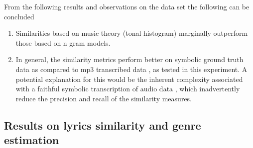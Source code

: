 \noindent From the following results and observations on the data set the following can be concluded

\begin{enumerate}
\item Similarities based on music theory (tonal histogram) marginally outperform those based on n gram models. 
\item In general, the similarity metrics perform better on symbolic ground truth data \cite{mirexsym} as compared to mp3 transcribed data \cite{msd}, as tested in this experiment. A potential explanation for this would be the inherent complexity associated with a faithful symbolic transcription of audio data \cite{melextract}, which inadvertently reduce the precision and recall of the similarity measures. 
\end{enumerate}

\subsection{Results on lyrics similarity and genre estimation} \label{genrelabels}

